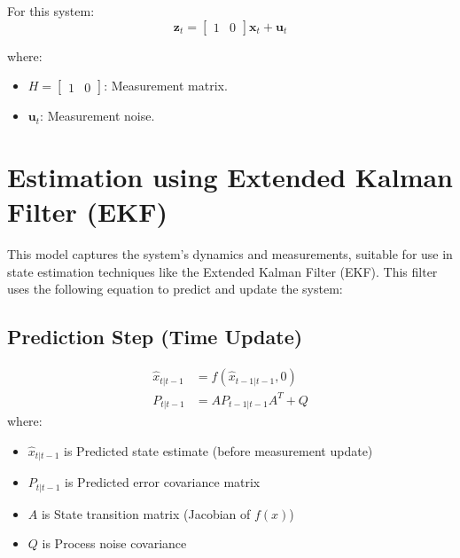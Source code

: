 \documentclass{article}
\begin{document}
For this system:
\[
\mathbf{z}_{t} =
\begin{bmatrix}
1 & 0
\end{bmatrix}
\mathbf{x}_t + \mathbf{u}_{t}
\]

where:
\begin{itemize}
    \item \( H = \begin{bmatrix} 1 & 0 \end{bmatrix} \): Measurement matrix.
    \item \( \mathbf{u}_{t} \): Measurement noise.
\end{itemize}

\section*{Estimation using Extended Kalman Filter (EKF)}

This model captures the system's dynamics and measurements, suitable for use in state estimation techniques like the Extended Kalman Filter (EKF). This filter uses the following equation to predict and update the system: 
\subsection*{Prediction Step (Time Update)}
\begin{align*}
\hat{x}_{t|t-1} &= f(\hat{x}_{t-1|t-1}, 0) \\
P_{t|t-1} &= A P_{t-1|t-1} A^T + Q
\end{align*}
where: 
\begin{itemize}
    \item \( \hat{x}_{t|t-1} \) is Predicted state estimate (before measurement update)
    \item \( P_{t|t-1} \) is Predicted error covariance matrix
    \item \( A \) is State transition matrix (Jacobian of \( f(x) \))
    \item \( Q \) is Process noise covariance
\end{itemize}
\end{document}
